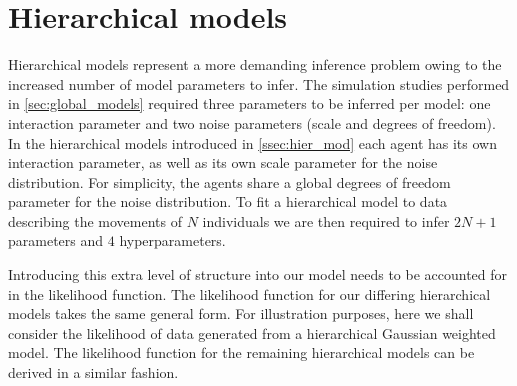 \section{Hierarchical models}

Hierarchical models represent a more demanding inference problem owing to the
increased number of model parameters to infer. The simulation studies performed
in \cref{sec:global_models} required three parameters to be inferred per model:
one interaction parameter and two noise parameters (scale and degrees of
freedom). In the hierarchical models introduced in \cref{ssec:hier_mod} each
agent has its own interaction parameter, as well as its own scale parameter for
the noise distribution. For simplicity, the agents share a global degrees of
freedom parameter for the noise distribution. To fit a hierarchical model to
data describing the movements of $N$ individuals we are then required to infer
$2N+1$ parameters and $4$ hyperparameters.

Introducing this extra level of structure into our model needs to be accounted
for in the likelihood function. The likelihood function for our differing
hierarchical models takes the same general form. For illustration purposes,
here we shall consider the likelihood of data generated from a hierarchical
Gaussian weighted model. The likelihood function for the remaining hierarchical
models can be derived in a similar fashion.

